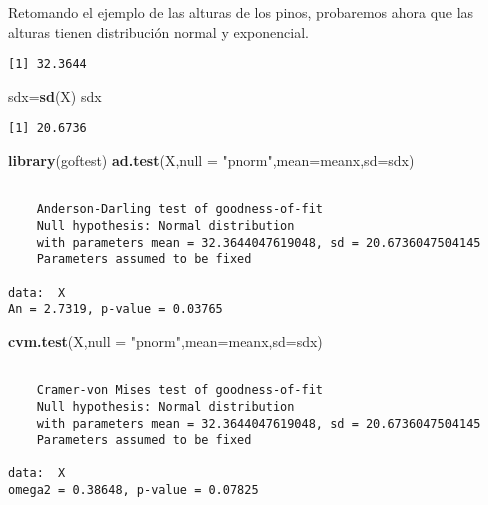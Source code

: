 \documentclass[a4paper,oneside,openany]{book}
\newenvironment{Shaded}{\begin{snugshade}}{\end{snugshade}}
\newcommand{\KeywordTok}[1]{\textcolor[rgb]{0.13,0.29,0.53}{\textbf{#1}}}
\newcommand{\DataTypeTok}[1]{\textcolor[rgb]{0.13,0.29,0.53}{#1}}
\newcommand{\StringTok}[1]{\textcolor[rgb]{0.31,0.60,0.02}{#1}}
\newcommand{\OperatorTok}[1]{\textcolor[rgb]{0.81,0.36,0.00}{\textbf{#1}}}
\newcommand{\NormalTok}[1]{#1}
\begin{document}
Retomando el ejemplo de las alturas de los pinos, probaremos ahora que
las alturas tienen distribución normal y exponencial.

\begin{Shaded}
\end{Shaded}

\begin{verbatim}
[1] 32.3644
\end{verbatim}

\begin{Shaded}
\begin{Highlighting}[]
\NormalTok{sdx=}\KeywordTok{sd}\NormalTok{(X)}
\NormalTok{sdx}
\end{Highlighting}
\end{Shaded}

\begin{verbatim}
[1] 20.6736
\end{verbatim}

\begin{Shaded}
\begin{Highlighting}[]
\KeywordTok{library}\NormalTok{(goftest)}
\KeywordTok{ad.test}\NormalTok{(X,}\DataTypeTok{null =} \StringTok{"pnorm"}\NormalTok{,}\DataTypeTok{mean=}\NormalTok{meanx,}\DataTypeTok{sd=}\NormalTok{sdx)}
\end{Highlighting}
\end{Shaded}

\begin{verbatim}

    Anderson-Darling test of goodness-of-fit
    Null hypothesis: Normal distribution
    with parameters mean = 32.3644047619048, sd = 20.6736047504145
    Parameters assumed to be fixed

data:  X
An = 2.7319, p-value = 0.03765
\end{verbatim}

\begin{Shaded}
\begin{Highlighting}[]
\KeywordTok{cvm.test}\NormalTok{(X,}\DataTypeTok{null =} \StringTok{"pnorm"}\NormalTok{,}\DataTypeTok{mean=}\NormalTok{meanx,}\DataTypeTok{sd=}\NormalTok{sdx)}
\end{Highlighting}
\end{Shaded}

\begin{verbatim}

    Cramer-von Mises test of goodness-of-fit
    Null hypothesis: Normal distribution
    with parameters mean = 32.3644047619048, sd = 20.6736047504145
    Parameters assumed to be fixed

data:  X
omega2 = 0.38648, p-value = 0.07825
\end{verbatim}
\end{document}
